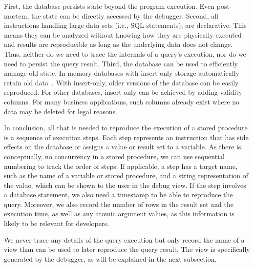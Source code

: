 First, the database persists state beyond the program execution.
Even post-mortem, the state can be directly accessed by the debugger.
Second, all instructions handling large data sets (i.e., SQL statements), are declarative.
This means they can be analyzed without knowing how they are physically executed and results are reproducible as long as the underlying data does not change.
Thus, neither do we need to trace the internals of a query's execution, nor do we need to persist the query result.
Third, the database can be used to efficiently manage old state.
In-memory databases with insert-only storage automatically retain old data~\cite{plattner09:a_common_database_approach}.
With insert-only, older versions of the database can be easily reproduced.
For other databases, insert-only can be achieved by adding validity columns.
For many business applications, such columns already exist where no data may be deleted for legal reasons.

In conclusion, all that is needed to reproduce the execution of a stored procedure is a sequence of execution steps.
Each step represents an instruction that has side effects on the database or assigns a value or result set to a variable.
As there is, conceptually, no concurrency in a stored procedure, we can use sequential numbering to track the order of steps.
If applicable, a step has a target name, such as the name of a variable or stored procedure, and a string representation of the value, which can be shown to the user in the debug view.
If the step involves a database statement, we also need a timestamp to be able to reproduce the query.
Moreover, we also record the number of rows in the result set and the execution time, as well as any atomic argument values, as this information is likely to be relevant for developers.

We never trace any details of the query execution but only record the name of a view than can be used to later reproduce the query result.
The view is specifically generated by the debugger, as will be explained in the next subsection.


